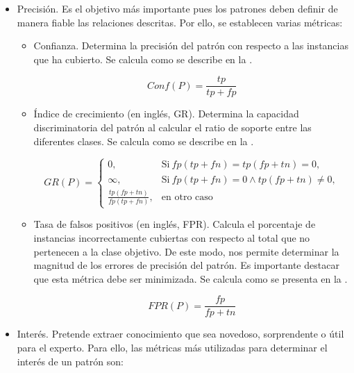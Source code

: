\documentclass[c5paper,10pt,twoside]{book}	   	%
\begin{document}
\begin{itemize}
	\item Precisión. Es el objetivo más importante pues los patrones deben definir de manera fiable las relaciones descritas. Por ello, se establecen varias métricas:
	
	\begin{itemize}
		\item Confianza. Determina la precisión del patrón con respecto a las instancias que ha cubierto. Se calcula como se describe en la  \cite{Fay96}.
		
		\begin{equation} \label{eq:conf}
		Conf(P) = \frac{tp}{tp + fp}
		\end{equation}
		
		\item Índice de crecimiento (en inglés, \ac{GR}). Determina la capacidad discriminatoria del patrón al calcular el ratio de soporte entre las diferentes clases. Se calcula como se describe en la .
		
		\begin{equation}
		GR(P) = 
		\begin{cases}
		0, & \text{Si}\ fp\left(tp+fn\right) = tp\left(fp+tn\right) = 0, \\
		\infty, & \text{Si}\ fp\left(tp+fn\right) = 0 \wedge tp\left(fp+tn\right) \neq 0, \\
		\frac{tp\left(fp+tn\right)}{fp\left(tp+fn\right)}, & \text{en otro caso}
		\end{cases}
		\label{eq:gr2}
		\end{equation}
		
		\item Tasa de falsos positivos (en inglés, \ac{FPR}). Calcula el porcentaje de instancias incorrectamente cubiertas con respecto al total que no pertenecen a la clase objetivo. De este modo, nos permite determinar la magnitud de los errores de precisión del patrón. Es importante destacar que esta métrica debe ser minimizada. Se calcula como se presenta en la  \cite{Gl02a}.
		
		\begin{equation} \label{eq:fpr}
		FPR(P) = \frac{fp}{fp + tn}
		\end{equation}
		
	
	\end{itemize}
	
	\item Interés. Pretende extraer conocimiento que sea novedoso, sorprendente o útil para el experto. Para ello, las métricas más utilizadas para determinar el interés de un patrón son:
	

\end{itemize}
\end{document}
